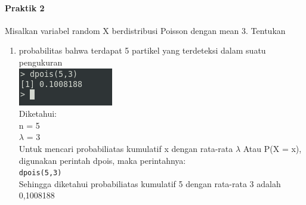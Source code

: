 \documentclass[a4paper,12pt]{article}
\begin{document}
\begin{enumerate}[label=\textbf{\Alph*.}]
\paragraph{Praktik 2\\}
Misalkan variabel random X berdistribusi Poisson dengan mean 3. Tentukan
\begin{enumerate}[label=\alph*.]
	\item probabilitas bahwa terdapat 5 partikel yang terdeteksi dalam suatu pengukuran\\
	\includegraphics{prakd2a}\\
	Diketahui:\\
	n = 5 \\
	$\lambda$ = 3 \\
	Untuk mencari probabiliatas kumulatif x dengan rata-rata $\lambda$
	Atau P(X = x), digunakan perintah dpois, maka perintahnya:\\
	\texttt{dpois(5,3)}\\
	Sehingga diketahui probabiliatas kumulatif 5 dengan rata-rata 3 adalah 0,1008188
	

\end{enumerate}
\end{enumerate}
\end{document}

